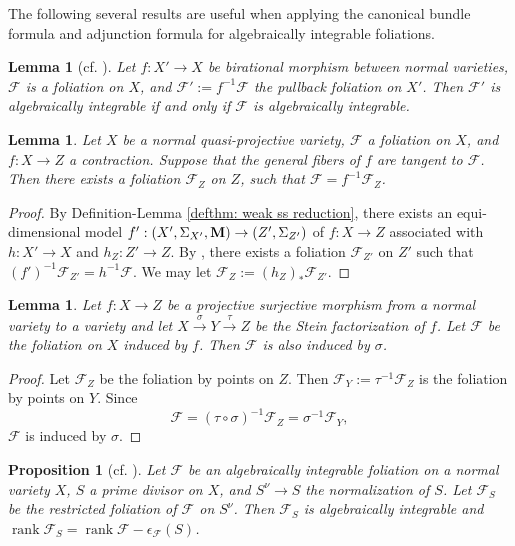 \documentclass[11pt]{amsart}
\numberwithin{equation}{section}
\newcommand{\Mm}{{\bf{M}}}
\newcommand{\rk}{\operatorname{rank}}
\newcommand{\Ff}{\mathcal{F}}
\newtheorem{lem}[thm]{Lemma}
\newtheorem{prop}[thm]{Proposition}
\theoremstyle{definition}
\theoremstyle{definition}
\theoremstyle{definition}
\begin{document}
The following several results are useful when applying the canonical bundle formula and adjunction formula for algebraically integrable foliations.


\begin{lem}[{cf. \cite[Lemma 2.7]{DLM23}}]\label{lem:foliation-invariant}
    Let $f: X'\to X$ be birational morphism between normal varieties, $\Ff$ is a foliation on $X$, and $\Ff':=f^{-1}\Ff$ the pullback foliation on $X'$. Then $\Ff'$ is algebraically integrable if and only if $\Ff$ is algebraically integrable.
\end{lem}

\begin{lem}\label{lem: gen fiber tangent mean induce}
Let $X$ be a normal quasi-projective variety, $\Ff$ a foliation on $X$, and $f: X\rightarrow Z$ a contraction. Suppose that the general fibers of $f$ are tangent to $\Ff$. Then there exists a foliation $\Ff_Z$ on $Z$, such that $\Ff=f^{-1}\Ff_Z$.
\end{lem}
\begin{proof}
By Definition-Lemma \ref{defthm: weak ss reduction}, there exists an equi-dimensional model $f': (X',\Sigma_{X'},\Mm)\rightarrow (Z',\Sigma_{Z'})$ of $f: X\rightarrow Z$ associated with $h: X'\rightarrow X$ and $h_Z: Z'\rightarrow Z$. By \cite[Lemma 6.7]{AD13}, there exists a foliation $\Ff_{Z'}$ on $Z'$ such that $(f')^{-1}\Ff_{Z'}=h^{-1}\Ff$. We may let $\Ff_Z:=(h_Z)_*\Ff_{Z'}$.
\end{proof}

\begin{lem}\label{lem: stein induce same foliation}
Let $f: X\rightarrow Z$ be a projective surjective morphism from a normal variety to a variety and let $X\xrightarrow{\sigma}Y\xrightarrow{\tau}Z$ be the Stein factorization of $f$. Let $\Ff$ be the foliation on $X$ induced by $f$. Then $\Ff$ is also induced by $\sigma$.
\end{lem}
\begin{proof}
Let $\Ff_Z$ be the foliation by points on $Z$. Then $\Ff_Y:=\tau^{-1}\Ff_Z$ is the foliation by points on $Y$. Since
$$\Ff=(\tau\circ \sigma)^{-1}\Ff_Z=\sigma^{-1}\Ff_Y,$$
 $\Ff$ is induced by $\sigma$.
\end{proof}

\begin{prop}[cf. {\cite[Proposition 3.2]{DLM23}}]\label{prop: a.i preserved adjunction}
Let $\Ff$ be an algebraically integrable foliation on a normal variety $X$, $S$ a prime divisor on $X$, and $S^\nu\rightarrow S$ the normalization of $S$. Let $\Ff_S$ be the restricted foliation of $\Ff$ on $S^\nu$. Then $\Ff_S$ is algebraically integrable and $\rk\Ff_S=\rk\Ff-\epsilon_{\Ff}(S)$.
\end{prop}
\end{document}
